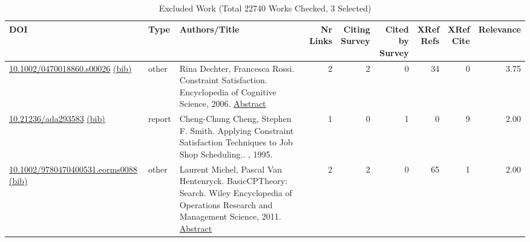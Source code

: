 {\scriptsize
\begin{longtable}{p{5cm}lp{11cm}rrrrrr}
\caption{Excluded Work (Total 22740 Works Checked, 3 Selected)}\\ \toprule
DOI & Type & Authors/Title & \shortstack{Nr\\Links} & \shortstack{Citing\\Survey} & \shortstack{Cited by\\Survey} & \shortstack{XRef\\Refs} & \shortstack{XRef\\Cite} & Relevance\\ \midrule\endhead
\bottomrule
\endfoot
\href{http://dx.doi.org/10.1002/0470018860.s00026}{10.1002/0470018860.s00026} \href{https://www.doi2bib.org/bib/10.1002/0470018860.s00026}{(bib)} & other & Rina Dechter, Francesca Rossi. Constraint Satisfaction. Encyclopedia of Cognitive Science, 2006. \hyperref[mw:mw15640]{Abstract} & 2 & 2 & 0 & 34 & 0 &  3.75\\
\href{http://dx.doi.org/10.21236/ada293583}{10.21236/ada293583} \href{https://www.doi2bib.org/bib/10.21236/ada293583}{(bib)} & report & Cheng-Chung Cheng, Stephen F. Smith. Applying Constraint Satisfaction Techniques to Job Shop Scheduling.. , 1995. & 1 & 0 & 1 & 0 & 9 &  2.00\\
\href{http://dx.doi.org/10.1002/9780470400531.eorms0088}{10.1002/9780470400531.eorms0088} \href{https://www.doi2bib.org/bib/10.1002/9780470400531.eorms0088}{(bib)} & other & Laurent Michel, Pascal Van Hentenryck. BasicCPTheory: Search. Wiley Encyclopedia of Operations Research and Management Science, 2011. \hyperref[mw:mw19349]{Abstract} & 2 & 2 & 0 & 65 & 1 &  2.00\\
\end{longtable}
}

